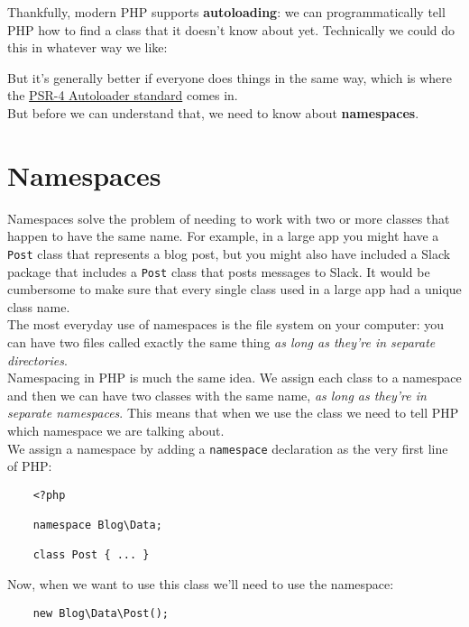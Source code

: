Thankfully, modern PHP supports \textbf{autoloading}: we can programmatically tell PHP how to find a class that it doesn't know about yet. Technically we could do this in whatever way we like:


But it's generally better if everyone does things in the same way, which is where the \href{https://www.php-fig.org/psr/psr-4/}{PSR-4 Autoloader standard} comes in.
\\

But before we can understand that, we need to know about \textbf{namespaces}.


\section{Namespaces}

Namespaces solve the problem of needing to work with two or more classes that happen to have the same name. For example, in a large app you might have a \texttt{Post} class that represents a blog post, but you might also have included a Slack package that includes a \texttt{Post} class that posts messages to Slack. It would be cumbersome to make sure that every single class used in a large app had a unique class name.
\\

The most everyday use of namespaces is the file system on your computer: you can have two files called exactly the same thing \textit{as long as they're in separate directories}.
\\

Namespacing in PHP is much the same idea. We assign each class to a namespace and then we can have two classes with the same name, \textit{as long as they're in separate namespaces}. This means that when we use the class we need to tell PHP which namespace we are talking about.
\\

We assign a namespace by adding a \texttt{namespace} declaration as the very first line of PHP:

\begin{verbatim}
    <?php

    namespace Blog\Data;

    class Post { ... }
\end{verbatim}

Now, when we want to use this class we'll need to use the namespace:

\begin{verbatim}
    new Blog\Data\Post();
\end{verbatim}

